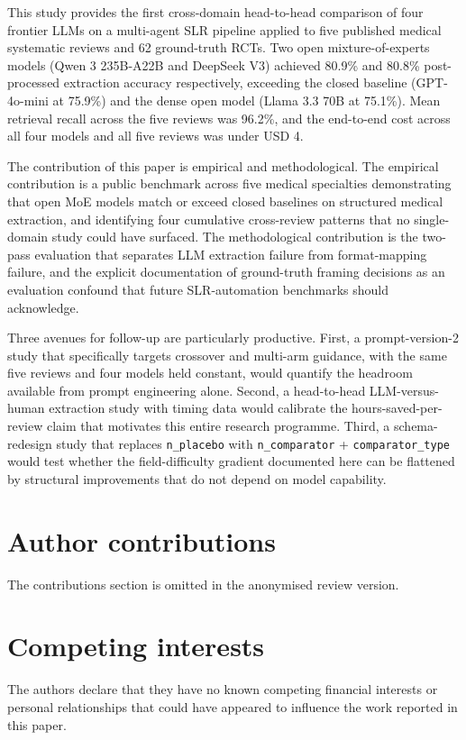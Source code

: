 \documentclass[a4paper,fleqn]{cas-sc}
\begin{document}
This study provides the first cross-domain head-to-head comparison of
four frontier LLMs on a multi-agent SLR pipeline applied to five
published medical systematic reviews and 62 ground-truth RCTs. Two
open mixture-of-experts models (Qwen 3 235B-A22B and DeepSeek V3)
achieved 80.9\% and 80.8\% post-processed extraction accuracy
respectively, exceeding the closed baseline (GPT-4o-mini at 75.9\%) and
the dense open model (Llama 3.3 70B at 75.1\%). Mean retrieval recall
across the five reviews was 96.2\%, and the end-to-end cost across all
four models and all five reviews was under USD 4.

The contribution of this paper is empirical and methodological. The
empirical contribution is a public benchmark across five
medical specialties demonstrating that open MoE models match or exceed
closed baselines on structured medical extraction, and identifying four
cumulative cross-review patterns that no single-domain study could have
surfaced. The methodological contribution is the two-pass evaluation
that separates LLM extraction failure from format-mapping failure, and
the explicit documentation of ground-truth framing decisions as an
evaluation confound that future SLR-automation benchmarks should
acknowledge.

Three avenues for follow-up are particularly productive. First, a
prompt-version-2 study that specifically targets crossover and
multi-arm guidance, with the same five reviews and four models held
constant, would quantify the headroom available from prompt engineering
alone. Second, a head-to-head LLM-versus-human extraction study with
timing data would calibrate the hours-saved-per-review claim that
motivates this entire research programme. Third, a schema-redesign study
that replaces \texttt{n\_placebo} with \texttt{n\_comparator} +
\texttt{comparator\_type} would test whether the field-difficulty
gradient documented here can be flattened by structural improvements
that do not depend on model capability.

\section*{Author contributions}
The contributions section is omitted in the anonymised review version.

\section*{Competing interests}
The authors declare that they have no known competing financial interests
or personal relationships that could have appeared to influence the work
reported in this paper.
\end{document}
